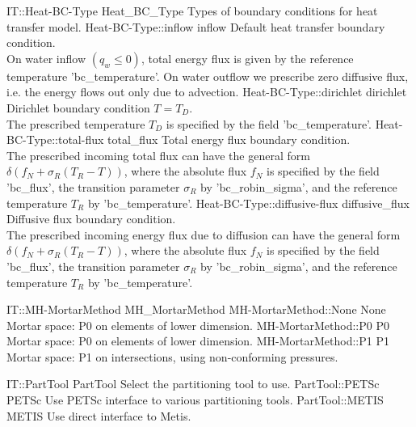 \begin{SelectionType}
	{IT::Heat-BC-Type}
	{Heat{\_}BC{\_}Type}
	{{{Types of boundary conditions for heat transfer model.}}}
		\SelectionItem
			{Heat-BC-Type::inflow}
			{inflow}
			{{{Default heat transfer boundary condition.}\\{
On water inflow }{$(q_w \le 0)$}{, total energy flux is given by the reference temperature 'bc{\_}temperature'. On water outflow we prescribe zero diffusive flux, i.e. the energy flows out only due to advection.}}}
		\SelectionItem
			{Heat-BC-Type::dirichlet}
			{dirichlet}
			{{{Dirichlet boundary condition }{$T = T_D $}{.}\\{
The prescribed temperature }{$T_D$}{ is specified by the field 'bc{\_}temperature'.}}}
		\SelectionItem
			{Heat-BC-Type::total-flux}
			{total{\_}flux}
			{{{Total energy flux boundary condition.}\\{
The prescribed incoming total flux can have the general form }{$\delta(f_N+\sigma_R(T_R-T) )$}{, where the absolute flux }{$f_N$}{ is specified by the field 'bc{\_}flux', the transition parameter }{$\sigma_R$}{ by 'bc{\_}robin{\_}sigma', and the reference temperature }{$T_R$}{ by 'bc{\_}temperature'.}}}
		\SelectionItem
			{Heat-BC-Type::diffusive-flux}
			{diffusive{\_}flux}
			{{{Diffusive flux boundary condition.}\\{
The prescribed incoming energy flux due to diffusion can have the general form }{$\delta(f_N+\sigma_R(T_R-T) )$}{, where the absolute flux }{$f_N$}{ is specified by the field 'bc{\_}flux', the transition parameter }{$\sigma_R$}{ by 'bc{\_}robin{\_}sigma', and the reference temperature }{$T_R$}{ by 'bc{\_}temperature'.}}}
\end{SelectionType}
\begin{SelectionType}
	{IT::MH-MortarMethod}
	{MH{\_}MortarMethod}
	{}
		\SelectionItem
			{MH-MortarMethod::None}
			{None}
			{{{Mortar space: P0 on elements of lower dimension.}}}
		\SelectionItem
			{MH-MortarMethod::P0}
			{P0}
			{{{Mortar space: P0 on elements of lower dimension.}}}
		\SelectionItem
			{MH-MortarMethod::P1}
			{P1}
			{{{Mortar space: P1 on intersections, using non-conforming pressures.}}}
\end{SelectionType}
\begin{SelectionType}
	{IT::PartTool}
	{PartTool}
	{{{Select the partitioning tool to use.}}}
		\SelectionItem
			{PartTool::PETSc}
			{PETSc}
			{{{Use PETSc interface to various partitioning tools.}}}
		\SelectionItem
			{PartTool::METIS}
			{METIS}
			{{{Use direct interface to Metis.}}}
\end{SelectionType}
